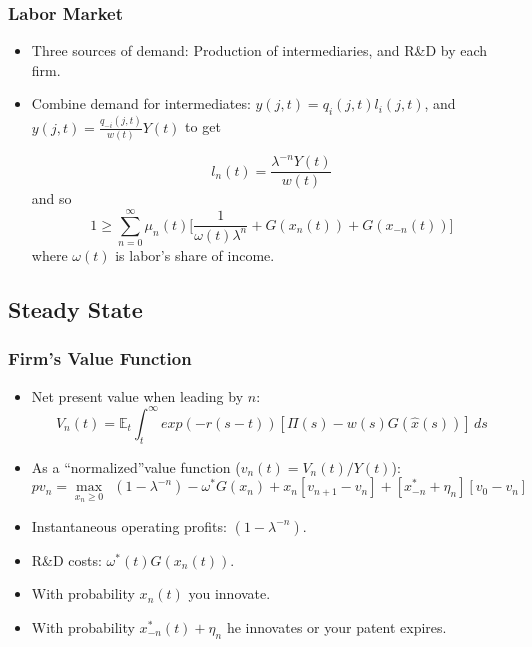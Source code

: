 \documentclass{beamer}
\begin{document}
\begin{frame}[t]\frametitle{Labor Market} 
  \begin{itemize}
    \item<+-> Three sources of demand: Production of intermediaries, and R\&D by each firm.
    \item<+-> Combine demand for intermediates: $y(j, t) = q_i(j, t)l_i(j, t)$, and $y(j, t) = \frac{q_{-i}(j, t)}{w(t)}Y(t)$ to get

      \begin{equation*}
        l_n(t) = \frac{\lambda^{-n}Y(t)}{w(t)}
      \end{equation*}
    and so
      \begin{equation*} \label{eq:labor_clearing}
        1 \geq \sum_{n=0}^{\infty} \mu_n(t) \Big[\frac{1}{\omega(t)\lambda^n} + G(x_n(t))    + G(x_{-n}(t))\Big]
      \end{equation*}
      where $\omega(t)$ is labor's share of income.

  \end{itemize}
\end{frame}
\subsection{Steady State}
\label{sub:steady_state}
\begin{frame}[t]\frametitle{Firm's Value Function} 
  \begin{itemize}
    \item<+-> Net present value when leading by $n$:
      \begin{equation*}
        V_n(t) = \mathbb{E}_t \int_{t}^{\infty} exp(-r(s - t))[\Pi(s) - w(s)G(\hat{x}(s))]\,ds 
      \end{equation*}
    \item<+-> As a ``normalized''value function ($v_n(t) = V_n(t) / Y(t)$):
      \begin{equation*} \label{eq:rvf_leader}  %
          pv_n = \max_{x_n \geq 0}\ \ (1 - \lambda^{-n}) - \omega^*G(x_n) + x_n[v_{n+1} - v_n] + [x_{-n}^* + \eta_n][v_0 - v_n]
        \end{equation*}
    \item<+-> Instantaneous operating profits: $(1 - \lambda^{-n})$.
    \item<+-> R\&D costs: $\omega^*(t)G(x_n(t))$.
    \item<+-> With probability $x_n(t)$ you innovate.
    \item<+-> With probability $x_{-n}^*(t) + \eta_n$ he innovates or your patent expires.
  \end{itemize}
\end{frame}
\end{document}
